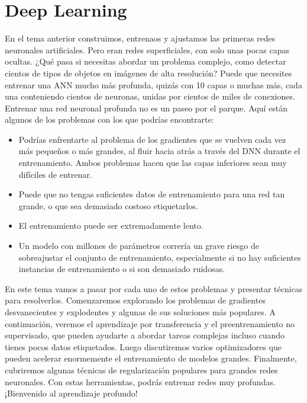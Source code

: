\documentclass[11pt]{article}
\date{}
\title{}
\begin{document}
\setcounter{tocdepth}{3}
\tableofcontents

\setlength\parindent{10pt}

\section{Deep Learning}
\label{sec:org98f2ef0}
En el tema anterior construimos, entrenaos y ajustamos las primeras
redes neuronales artificiales. Pero eran redes superficiales, con solo
unas pocas capas ocultas. ¿Qué pasa si necesitas abordar un problema
complejo, como detectar cientos de tipos de objetos en imágenes de
alta resolución? Puede que necesites entrenar una ANN mucho más
profunda, quizás con 10 capas o muchas más, cada una conteniendo
cientos de neuronas, unidas por cientos de miles de
conexiones. Entrenar una red neuronal profunda no es un paseo por el
parque. Aquí están algunos de los problemas con los que podrías
encontrarte:

\begin{itemize}
\item Podrías enfrentarte al problema de los gradientes que se vuelven
cada vez más pequeños o más grandes, al fluir hacia atrás a través
del DNN durante el entrenamiento. Ambos problemas hacen que las
capas inferiores sean muy difíciles de entrenar.
\item Puede que no tengas suficientes datos de entrenamiento para una red
tan grande, o que sea demasiado costoso etiquetarlos.
\item El entrenamiento puede ser extremadamente lento.
\item Un modelo con millones de parámetros correría un grave riesgo de
sobreajustar el conjunto de entrenamiento, especialmente si no hay
suficientes instancias de entrenamiento o si son demasiado ruidosas.
\end{itemize}

En este tema vamos a pasar por cada uno de estos problemas y
presentar técnicas para resolverlos. Comenzaremos explorando los
problemas de gradientes desvanecientes y explodentes y algunas de sus
soluciones más populares. A continuación, veremos el aprendizaje por
transferencia y el preentrenamiento no supervisado, que pueden
ayudarte a abordar tareas complejas incluso cuando tienes pocos datos
etiquetados. Luego discutiremos varios optimizadores que pueden
acelerar enormemente el entrenamiento de modelos grandes. Finalmente,
cubriremos algunas técnicas de regularización populares para grandes
redes neuronales. Con estas herramientas, podrás entrenar redes muy
profundas. ¡Bienvenido al aprendizaje profundo!
\end{document}
